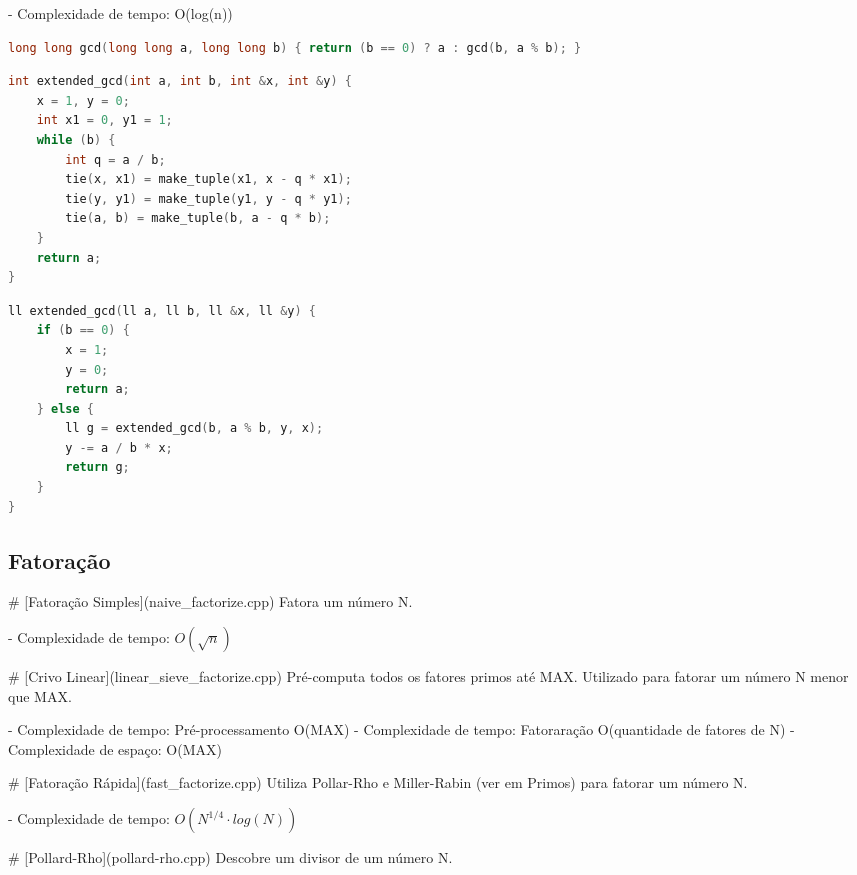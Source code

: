 \documentclass[11pt, a4paper, twoside]{article}
\begin{document}
- Complexidade de tempo: O(log(n))

\begin{lstlisting}[language=C++]
long long gcd(long long a, long long b) { return (b == 0) ? a : gcd(b, a % b); }
\end{lstlisting}

\begin{multicols}{2}
\begin{lstlisting}[language=C++]
int extended_gcd(int a, int b, int &x, int &y) {
    x = 1, y = 0;
    int x1 = 0, y1 = 1;
    while (b) {
        int q = a / b;
        tie(x, x1) = make_tuple(x1, x - q * x1);
        tie(y, y1) = make_tuple(y1, y - q * y1);
        tie(a, b) = make_tuple(b, a - q * b);
    }
    return a;
}
\end{lstlisting}
\end{multicols}

\begin{multicols}{2}
\begin{lstlisting}[language=C++]
ll extended_gcd(ll a, ll b, ll &x, ll &y) {
    if (b == 0) {
        x = 1;
        y = 0;
        return a;
    } else {
        ll g = extended_gcd(b, a % b, y, x);
        y -= a / b * x;
        return g;
    }
}
\end{lstlisting}
\end{multicols}

\subsection{Fatoração}



\# [Fatoração Simples](naive\_factorize.cpp)
Fatora um número N.

- Complexidade de tempo: $O(\sqrt n )$

\# [Crivo Linear](linear\_sieve\_factorize.cpp)
Pré-computa todos os fatores primos até MAX.
Utilizado para fatorar um número N menor que MAX.

- Complexidade de tempo: Pré-processamento O(MAX)
- Complexidade de tempo: Fatoraração O(quantidade de fatores de N)
- Complexidade de espaço: O(MAX)

\# [Fatoração Rápida](fast\_factorize.cpp)
Utiliza Pollar-Rho e Miller-Rabin (ver em Primos) para fatorar um número N.

- Complexidade de tempo: $O(N^{1/4} \cdot log(N))$

\# [Pollard-Rho](pollard-rho.cpp)
Descobre um divisor de um número N.
\end{document}
